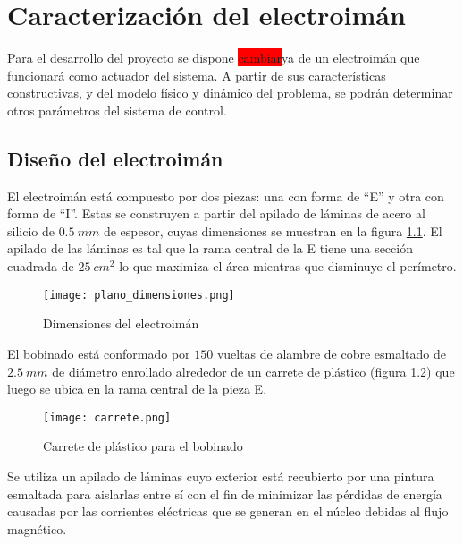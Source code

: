 \chapter{Caracterización del  electroimán}  \label{cap:CaracterizacionElectroiman}

\noindent Para el desarrollo del proyecto se dispone \colorbox{red}{cambiar}ya de un electroimán que funcionará como actuador del sistema. A partir de sus características constructivas, y del modelo físico y dinámico del problema, se podrán determinar otros parámetros del sistema de control.

\section{Diseño del electroimán} \label{section_disenio_electroimán}



\noindent El electroimán está compuesto por dos piezas: una con forma de “E” y otra con forma de “I”. Estas se construyen a partir del apilado de láminas de acero al silicio de $0.5\:mm$ de espesor, cuyas dimensiones se muestran en la figura \ref{fig:img_plano_dimensiones}. El apilado de las láminas es tal que la rama central de la E tiene una sección cuadrada de $25\:cm^{2}$ lo que maximiza el área mientras que disminuye el perímetro.

\begin{figure}[H]
	\centering
	\texttt{[image: plano\_dimensiones.png]}
	\caption{Dimensiones del electroimán}
	\label{fig:img_plano_dimensiones}
\end{figure}

\noindent El bobinado está conformado por $150$ vueltas de alambre de cobre esmaltado de $2.5\:mm$ de diámetro enrollado alrededor de un carrete de plástico (figura \ref{fig:img_carrete}) que luego se ubica en la rama central de la pieza E.

\begin{figure}[H]
	\centering
	\texttt{[image: carrete.png]}
	\caption{Carrete de plástico para el bobinado}
	\label{fig:img_carrete}
\end{figure}


\noindent Se utiliza un apilado de láminas cuyo exterior está recubierto por una pintura esmaltada para aislarlas entre sí con el fin de minimizar las pérdidas de energía causadas por las corrientes eléctricas que se generan en el núcleo debidas al flujo magnético. 

